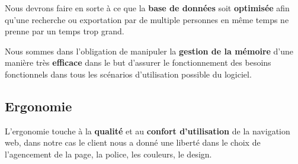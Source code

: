 {Nous devrons faire en sorte à ce que la \textbf{base de données} soit \textbf{optimisée} afin qu'une recherche ou exportation par de multiple personnes en même temps ne prenne par un temps trop grand.\par}
Nous sommes dans l'obligation de manipuler la \textbf{gestion de la mémoire} d'une manière très \textbf{efficace} dans le but d'assurer le fonctionnement des besoins fonctionnels dans tous les scénarios d'utilisation possible du logiciel. 

\subsection{Ergonomie}
L’ergonomie touche à la \textbf{qualité} et au \textbf{confort d’utilisation} de la navigation web, dans notre cas le client nous a donné une liberté dans le choix de l'agencement de la page, la police, les couleurs, le design. 
